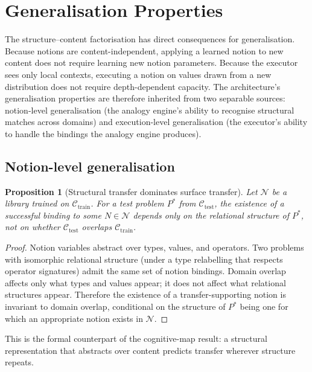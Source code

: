 \documentclass[11pt,a4paper]{article}
\theoremstyle{plain}
\newtheorem{proposition}[theorem]{Proposition}
\theoremstyle{definition}
\theoremstyle{remark}
\newcommand{\Notions}{\mathcal{N}}
\begin{document}
\section{Generalisation Properties}
\label{sec:generalization}

The structure--content factorisation has direct consequences for generalisation. Because notions are content-independent, applying a learned notion to new content does not require learning new notion parameters. Because the executor sees only local contexts, executing a notion on values drawn from a new distribution does not require depth-dependent capacity. The architecture's generalisation properties are therefore inherited from two separable sources: notion-level generalisation (the analogy engine's ability to recognise structural matches across domains) and execution-level generalisation (the executor's ability to handle the bindings the analogy engine produces).

\subsection{Notion-level generalisation}

\begin{proposition}[Structural transfer dominates surface transfer]
\label{prop:structural-dominance}
Let $\Notions$ be a library trained on $\mathcal{C}_{\mathrm{train}}$. For a test problem $P^\ast$ from $\mathcal{C}_{\mathrm{test}}$, the existence of a successful binding to some $N \in \Notions$ depends only on the relational structure of $P^\ast$, not on whether $\mathcal{C}_{\mathrm{test}}$ overlaps $\mathcal{C}_{\mathrm{train}}$.
\end{proposition}

\begin{proof}
Notion variables abstract over types, values, and operators. Two problems with isomorphic relational structure (under a type relabelling that respects operator signatures) admit the same set of notion bindings. Domain overlap affects only what types and values appear; it does not affect what relational structures appear. Therefore the existence of a transfer-supporting notion is invariant to domain overlap, conditional on the structure of $P^\ast$ being one for which an appropriate notion exists in $\Notions$.
\end{proof}

This is the formal counterpart of the cognitive-map result: a structural representation that abstracts over content predicts transfer wherever structure repeats.
\end{document}
